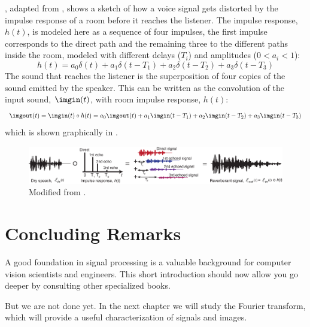\Fig{\ref{fig:impulse_response_room_b}}, adapted from \cite{TraerE7856}, shows a sketch of how a voice signal gets distorted by the impulse response of a room before it reaches the listener. The impulse response, $h (t)$, is modeled here as a sequence of four impulses, the first impulse corresponds to the direct path and the remaining three to the different paths inside the room, modeled with different delays ($T_i$) and amplitudes ($0 < a_i < 1$):
\begin{equation}
	h (t) = a_0 \delta (t)
	+ a_1 \delta \left(t-T_1 \right)
	+ a_2 \delta \left( t-T_2 \right)
	+ a_3 \delta \left( t-T_3 \right)
\end{equation}
The sound that reaches the listener is the superposition of four copies of the sound emitted by the speaker. This can be written as the convolution of the input sound, $\imgin (t)$, with room impulse response, $h (t)$:
\begin{equation}
	\imgout (t) = \imgin (t) \circ h(t) = a_0 \imgout (t)
	+ a_1 \imgin (t-T_1)
	+ a_2 \imgin (t-T_2)
	+ a_3 \imgin (t-T_3)
\end{equation}
which is shown graphically in \fig{\ref{fig:impulse_response_room_b}}.
\begin{figure}
	\centerline{
		\includegraphics[width=1\linewidth]{figures/linear_image_filtering/impulse_response_room_b.eps}
	}
	\caption{Modified from \cite{TraerE7856}.}
	\label{fig:impulse_response_room_b}
\end{figure}

\section{Concluding Remarks}

A good foundation in signal processing is a valuable background for computer vision scientists and engineers. This short introduction should now allow you go deeper by consulting other specialized books.

But we are not done yet. In the next chapter we will study the Fourier transform, which will provide a useful characterization of signals and images.

